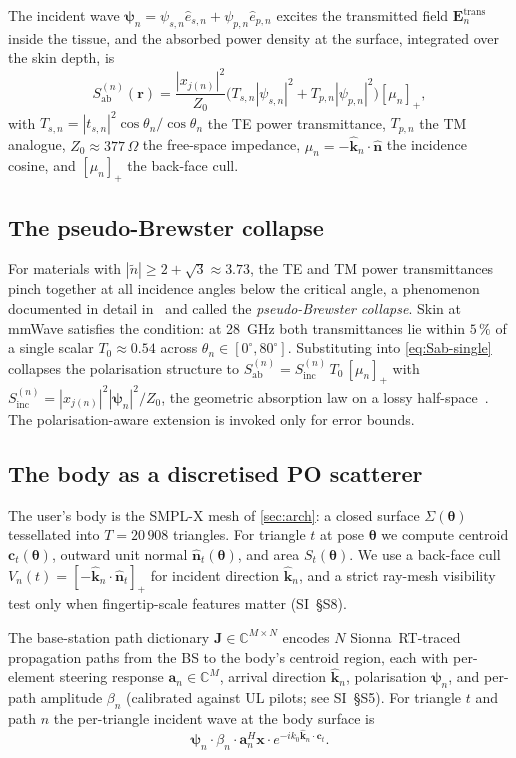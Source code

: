 \documentclass[journal,twocolumn,10pt]{IEEEtran}
\theoremstyle{plain}
\theoremstyle{definition}
\theoremstyle{remark}
\newcommand{\nhat}{\hat{\bm{n}}}
\newcommand{\rr}{\mathbf{r}}
\newcommand{\xx}{\mathbf{x}}
\newcommand{\EE}{\mathbf{E}}
\newcommand{\Sinc}{S_{\mathrm{inc}}}
\newcommand{\Sab}{S_{\mathrm{ab}}}
\newcommand{\Jmat}{\mathbf{J}}
\newcommand{\psin}{\bm{\psi}_n}
\newcommand{\thetab}{\bm{\theta}}
\newcommand{\Tepskin}{T_{0}}
\newcommand{\Complex}{\mathbb{C}}
\newcommand{\ntilde}{\tilde{n}}
\begin{document}
The incident wave $\psin = \psi_{s,n}\hat{e}_{s,n} +
\psi_{p,n}\hat{e}_{p,n}$ excites the transmitted field
$\EE^{\mathrm{trans}}_n$ inside the tissue, and the absorbed power
density at the surface, integrated over the skin depth, is
\begin{equation}\label{eq:Sab-single}
\Sab^{(n)}(\rr) = \frac{|x_{j(n)}|^2}{Z_0}\bigl(T_{s,n}|\psi_{s,n}|^2
+ T_{p,n}|\psi_{p,n}|^2\bigr)[\mu_n]_+,
\end{equation}
with $T_{s,n} = |t_{s,n}|^2 \cos\theta_n / \cos\theta_n$ the TE
power transmittance, $T_{p,n}$ the TM analogue, $Z_0 \approx 377\,\Omega$
the free-space impedance, $\mu_n = -\hat{\bm{k}}_n\cdot\nhat$ the
incidence cosine, and $[\mu_n]_+$ the back-face cull.

\subsection{The pseudo-Brewster collapse}

For materials with $|\ntilde| \geq 2 + \sqrt{3} \approx 3.73$, the
TE and TM power transmittances pinch together at all incidence
angles below the critical angle, a phenomenon documented in detail
in~\cite{WydaeghePB2024} and called the
\emph{pseudo-Brewster collapse}. Skin at mmWave satisfies the
condition: at 28~GHz both transmittances lie within $5\,\%$ of a
single scalar $\Tepskin \approx 0.54$ across
$\theta_n \in [0^{\circ}, 80^{\circ}]$. Substituting into
\cref{eq:Sab-single} collapses the polarisation structure to
$\Sab^{(n)} = \Sinc^{(n)}\,\Tepskin\,[\mu_n]_+$ with
$\Sinc^{(n)} = |x_{j(n)}|^2 |\psin|^2 / Z_0$, the geometric
absorption law on a lossy half-space~\cite{BornWolf}. The
polarisation-aware extension is invoked only for error bounds.

\subsection{The body as a discretised PO scatterer}

The user's body is the SMPL-X mesh of \cref{sec:arch}: a closed
surface $\Sigma(\thetab)$ tessellated into $T = 20\,908$ triangles.
For triangle $t$ at pose $\thetab$ we compute centroid
$\bm{c}_t(\thetab)$, outward unit normal $\nhat_t(\thetab)$, and
area $S_t(\thetab)$. We use a back-face cull
$V_n(t) = [-\hat{\bm{k}}_n \cdot \nhat_t]_+$ for incident direction
$\hat{\bm{k}}_n$, and a strict ray-mesh visibility test only
when fingertip-scale features matter (SI~\S{}S8).

The base-station path dictionary $\Jmat \in \Complex^{M \times N}$
encodes $N$ Sionna~RT-traced propagation paths from the BS to the
body's centroid region, each with per-element steering response
$\bm{a}_n \in \Complex^{M}$, arrival direction $\hat{\bm{k}}_n$,
polarisation $\psin$, and per-path amplitude $\beta_n$ (calibrated
against UL pilots; see SI~\S{}S5). For triangle $t$ and path $n$
the per-triangle incident wave at the body surface is
\begin{equation}\label{eq:incident-wave}
\psin \cdot \beta_n \cdot \bm{a}_n^{H}\xx \cdot
e^{-ik_0 \hat{\bm{k}}_n \cdot \bm{c}_t}.
\end{equation}
\end{document}
